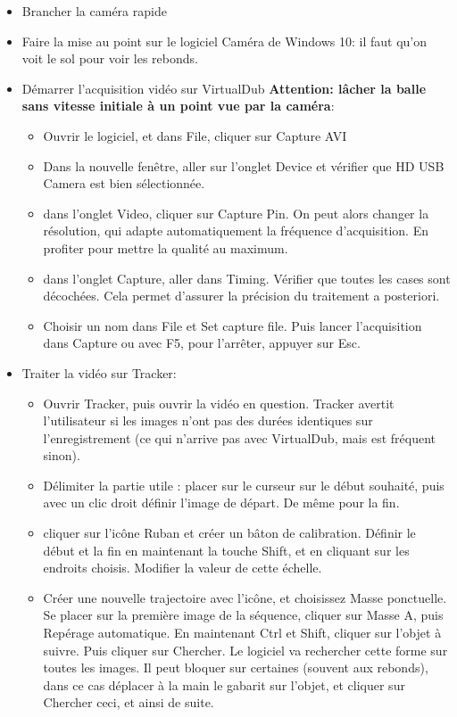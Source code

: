 \documentclass[11pt]{report}
\numberwithin{figure}{section}
\numberwithin{equation}{section}
\numberwithin{table}{section}
\newcommand{\1}{\boldsymbol{1}}
\begin{document}
\begin{tcolorbox}[breakable, enhanced, colback=red!2!white,colframe=mycolor!85!black,title=\textbf{\textbf{Expérience}}]
\begin{itemize}[label=$\triangleright$]
\item Brancher la caméra rapide
\item Faire la mise au point sur le logiciel Caméra de Windows 10: il faut qu'on voit le sol pour voir les rebonds.
\item Démarrer l'acquisition vidéo sur VirtualDub \textbf{Attention: lâcher la balle sans vitesse initiale à un point vue par la caméra}:
	\begin{itemize}
	\item Ouvrir le logiciel, et dans File, cliquer sur Capture AVI
	\item Dans la nouvelle fenêtre, aller sur l'onglet Device et vérifier que HD USB Camera est bien sélectionnée.
	\item dans l’onglet Video, cliquer sur Capture Pin. On peut alors changer la résolution, qui adapte automatiquement la fréquence d’acquisition. En profiter pour mettre la qualité au maximum.
	\item dans l’onglet Capture, aller dans Timing. Vérifier que toutes les cases sont décochées. Cela permet d’assurer la précision du traitement a posteriori.
	\item Choisir un nom dans File et Set capture file. Puis lancer l’acquisition dans Capture ou avec F5, pour l’arrêter, appuyer sur Esc.
	\end{itemize}
\item Traiter la vidéo sur Tracker:
	\begin{itemize}
	\item Ouvrir Tracker, puis ouvrir la vidéo en question. Tracker avertit l’utilisateur si les images n’ont pas des durées identiques sur l’enregistrement (ce qui n’arrive pas avec VirtualDub, mais est fréquent sinon).
	\item Délimiter la partie utile : placer sur le curseur sur le début souhaité, puis avec un clic droit définir l’image de départ. De même pour la fin.
	\item cliquer sur l’icône Ruban et créer un bâton de calibration. Définir le début et la fin en maintenant la touche Shift, et en cliquant sur les endroits choisis. Modifier la valeur de cette échelle.
	\item Créer une nouvelle trajectoire avec l’icône, et choisissez Masse ponctuelle. Se placer sur la première image de la séquence, cliquer sur Masse A, puis Repérage automatique. En maintenant Ctrl et Shift, cliquer sur l’objet à suivre. Puis cliquer sur Chercher. Le logiciel va rechercher cette forme sur toutes les images. Il peut bloquer sur certaines (souvent aux rebonds), dans ce cas déplacer à la main le gabarit sur l’objet, et cliquer sur Chercher ceci, et ainsi de suite.

\end{itemize}
\end{itemize}
\end{tcolorbox}
\end{document}
